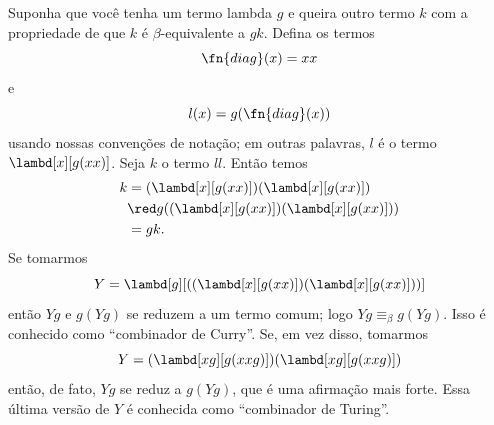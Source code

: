 \documentclass[../../../include/open-logic-section]{subfiles}
\begin{document}

Suponha que você tenha um termo lambda $g$ e queira outro termo $k$ com a
propriedade de que $k$ é $\beta$-equivalente a $gk$. Defina os termos
\[
\fn{diag}(x) = xx
\]
e
\[
l(x) = g(\fn{diag}(x))
\]
usando nossas convenções de notação; em outras palavras, $l$ é o termo
$\lambd[x][g(xx)]$. Seja $k$ o termo $ll$. Então temos
\begin{align*}
k & = (\lambd[x][g(xx)])(\lambd[x][g(xx)]) \\
& \red  g((\lambd[x][g(xx)])(\lambd[x][g(xx)])) \\
& = gk.
\end{align*}
Se tomarmos
\[
Y = \lambd[g][((\lambd[x][g(xx)])(\lambd[x][g(xx)]))]
\]
então $Yg$ e $g(Yg)$ se reduzem a um termo comum; logo $Yg \equiv_\beta
g(Yg)$. Isso é conhecido como ``combinador de Curry''. Se, em vez disso,
tomarmos
\[
Y = (\lambd[xg][g(xxg)])(\lambd[xg][g(xxg)])
\]
então, de fato, $Yg$ se reduz a $g(Yg)$, que é uma afirmação mais forte.
Essa última versão de $Y$ é conhecida como ``combinador de Turing''.
\end{document}
